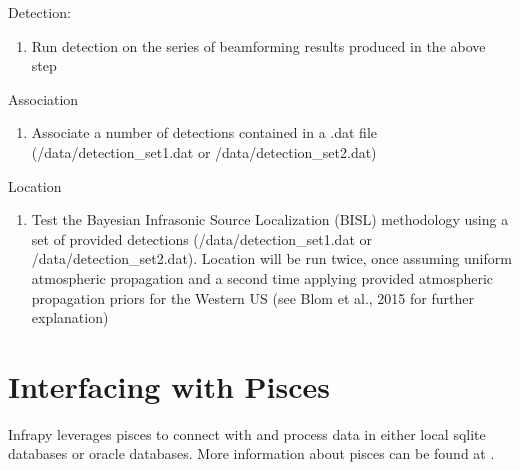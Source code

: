 \documentclass[letterpaper,10pt,english]{sphinxmanual}
\begin{document}
Detection:
\begin{enumerate}
%
\item {} 
Run detection on the series of beamforming results produced in the above step

\end{enumerate}

\begin{sphinxVerbatim}[commandchars=\\\{\}]
  
\end{sphinxVerbatim}

Association
\begin{enumerate}
%
\item {} 
Associate a number of detections contained in a .dat file (/data/detection\_set1.dat or /data/detection\_set2.dat)

\end{enumerate}

\begin{sphinxVerbatim}[commandchars=\\\{\}]
  
\end{sphinxVerbatim}

Location
\begin{enumerate}
%
\item {} 
Test the Bayesian Infrasonic Source Localization (BISL) methodology using a set of provided detections (/data/detection\_set1.dat or /data/detection\_set2.dat).  Location will be run twice, once assuming uniform atmospheric propagation and a second time applying provided atmospheric propagation priors for the Western US (see Blom et al., 2015 for further explanation)

\end{enumerate}

\begin{sphinxVerbatim}[commandchars=\\\{\}]
  
\end{sphinxVerbatim}


\section{Interfacing with Pisces}
\label{\detokenize{pisces:interfacing-with-pisces}}\label{\detokenize{pisces:pisces}}\label{\detokenize{pisces::doc}}
Infrapy leverages pisces to connect with and process data in either local sqlite databases or oracle databases. More information about pisces can be found at .
\end{document}
